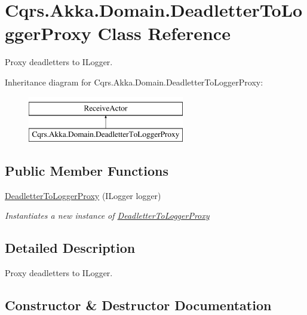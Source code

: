 \hypertarget{classCqrs_1_1Akka_1_1Domain_1_1DeadletterToLoggerProxy}{}\section{Cqrs.\+Akka.\+Domain.\+Deadletter\+To\+Logger\+Proxy Class Reference}
\label{classCqrs_1_1Akka_1_1Domain_1_1DeadletterToLoggerProxy}


Proxy deadletters to I\+Logger.  


Inheritance diagram for Cqrs.\+Akka.\+Domain.\+Deadletter\+To\+Logger\+Proxy\+:\begin{figure}[H]
\begin{center}
\leavevmode
\includegraphics[height=2.000000cm]{classCqrs_1_1Akka_1_1Domain_1_1DeadletterToLoggerProxy}
\end{center}
\end{figure}
\subsection*{Public Member Functions}
\begin{DoxyCompactItemize}
\item 
\hyperlink{classCqrs_1_1Akka_1_1Domain_1_1DeadletterToLoggerProxy_abc265a56e0952ad0c0e2f2572f8f96df_abc265a56e0952ad0c0e2f2572f8f96df}{Deadletter\+To\+Logger\+Proxy} (I\+Logger logger)
\begin{DoxyCompactList}\small\item\em Instantiates a new instance of \hyperlink{classCqrs_1_1Akka_1_1Domain_1_1DeadletterToLoggerProxy}{Deadletter\+To\+Logger\+Proxy} \end{DoxyCompactList}\end{DoxyCompactItemize}


\subsection{Detailed Description}
Proxy deadletters to I\+Logger. 



\subsection{Constructor \& Destructor Documentation}
\mbox{\label{classCqrs_1_1Akka_1_1Domain_1_1DeadletterToLoggerProxy_abc265a56e0952ad0c0e2f2572f8f96df_abc265a56e0952ad0c0e2f2572f8f96df}} 
